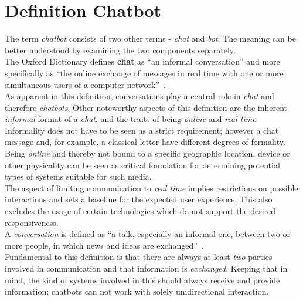 \section{Definition Chatbot}
\label{defchatbot}


The term \emph{chatbot} consists of two other terms - \emph{chat} and \emph{bot}.
The meaning can be better understood by examining the two components separately.
\\

The Oxford Dictionary defines \textbf{chat} as ``an informal conversation'' and more specifically as ``the online exchange of messages in real time with one or more simultaneous users of a computer network''~\cite{oxfordchat}.
\\
As apparent in this definition, conversations play a central role in \emph{chat} and therefore \emph{chatbots}.
Other noteworthy aspects of this definition are the inherent \emph{informal} format of a \emph{chat},
and the traits of being \emph{online} and \emph{real time}.
\\

Informality does not have to be seen as a strict requirement; however a chat message and, for example, a classical letter have different degrees of formality.
\\

Being \emph{online} and thereby not bound to a specific geographic location, device or other physicality can be seen as critical foundation for determining potential types of systems suitable for such media.
\\

The aspect of limiting communication to \emph{real time} implies restrictions on possible interactions and sets a baseline for the expected user experience.
This also excludes the usage of certain technologies which do not support the desired responsiveness.
\\

A \emph{conversation} is defined as ``a talk, especially an informal one, between two or more people, in which news and ideas are exchanged''~\cite{oxfordconversation}.
\\
Fundamental to this definition is that there are always at least \emph{two} parties involved in communication and that information is \emph{exchanged}.
Keeping that in mind, the kind of systems involved in this should always receive and provide information;
chatbots can not work with solely unidirectional interaction.
\\

